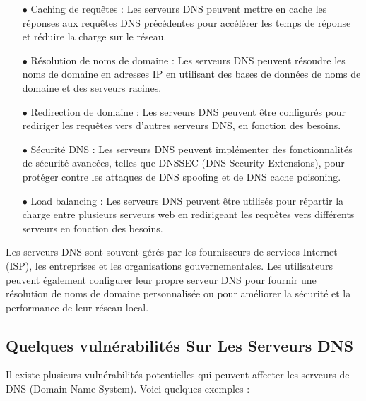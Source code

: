  \begin{enumerate}
	
	\item[$\bullet$]     Caching de requêtes : Les serveurs DNS peuvent mettre en cache les réponses aux requêtes DNS précédentes pour accélérer les temps de réponse et réduire la charge sur le réseau.
	 
\item[$\bullet$] Résolution de noms de domaine : Les serveurs DNS peuvent résoudre les noms de domaine en adresses IP en utilisant des bases de données de noms de domaine et des serveurs racines.
	 
	 \item[$\bullet$] Redirection de domaine : Les serveurs DNS peuvent être configurés pour rediriger les requêtes vers d'autres serveurs DNS, en fonction des besoins.
	 
	 \item[$\bullet$] Sécurité DNS : Les serveurs DNS peuvent implémenter des fonctionnalités de sécurité avancées, telles que DNSSEC (DNS Security Extensions), pour protéger contre les attaques de DNS spoofing et de DNS cache poisoning.
	 
	 \item[$\bullet$] Load balancing : Les serveurs DNS peuvent être utilisés pour répartir la charge entre plusieurs serveurs web en redirigeant les requêtes vers différents serveurs en fonction des besoins.
	 
\end{enumerate}

Les serveurs DNS sont souvent gérés par les fournisseurs de services Internet (ISP), les entreprises et les organisations gouvernementales. Les utilisateurs peuvent également configurer leur propre serveur DNS pour fournir une résolution de noms de domaine personnalisée ou pour améliorer la sécurité et la performance de leur réseau local.
\subsection{Quelques vulnérabilités Sur Les Serveurs DNS }

Il existe plusieurs vulnérabilités potentielles qui peuvent affecter les serveurs de DNS (Domain Name System). Voici quelques exemples :\\

